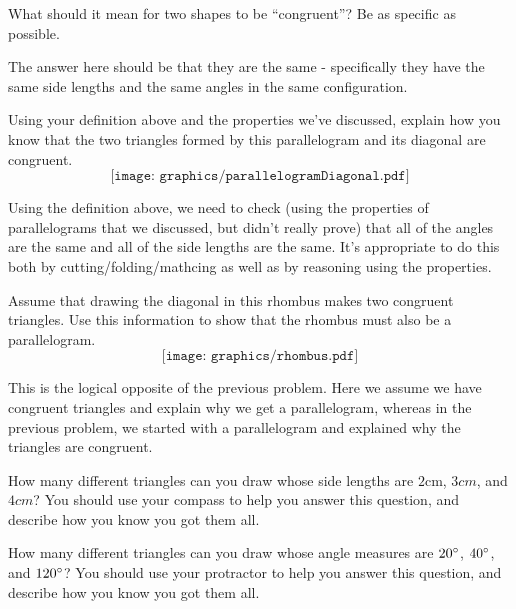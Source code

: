 \documentclass[nooutcomes]{ximera}
\begin{document}
\newpage
\begin{problem}
What should it mean for two shapes to be ``congruent''?  Be as specific as possible.
\begin{instructorNotes}
The answer here should be that they are the same - specifically they have the same side lengths and the same angles in the same configuration.
\end{instructorNotes}
\end{problem}


\begin{problem}
Using your definition above and the properties we've discussed, explain how you know that the two triangles formed by this parallelogram and its diagonal are congruent.
\[
\texttt{[image: graphics/parallelogramDiagonal.pdf]}
\]

\begin{instructorNotes}
Using the definition above, we need to check (using the properties of parallelograms that we discussed, but didn't really prove) that all of the angles are the same and all of the side lengths are the same.  It's appropriate to do this both by cutting/folding/mathcing as well as by reasoning using the properties.
\end{instructorNotes}
\end{problem}

\begin{problem}
Assume that drawing the diagonal in this rhombus makes two congruent triangles.  Use this information to show that the rhombus must also be a parallelogram.
\[
\texttt{[image: graphics/rhombus.pdf]}
\]

\begin{instructorNotes}
This is the logical opposite of the previous problem.  Here we assume we have congruent triangles and explain why we get a parallelogram, whereas in the previous problem, we started with a parallelogram and explained why the triangles are congruent.
\end{instructorNotes}
\end{problem}

\begin{problem}
How many different triangles can you draw whose side lengths are $2$cm, $3cm$, and $4cm$?  You should use your compass to help you answer this question, and describe how you know you got them all.
\end{problem}

\begin{problem}
How many different triangles can you draw whose angle measures are $20\degree$, $40\degree$, and $120\degree$?  You should use your protractor to help you answer this question, and describe how you know you got them all.
\end{problem}
\end{document}
